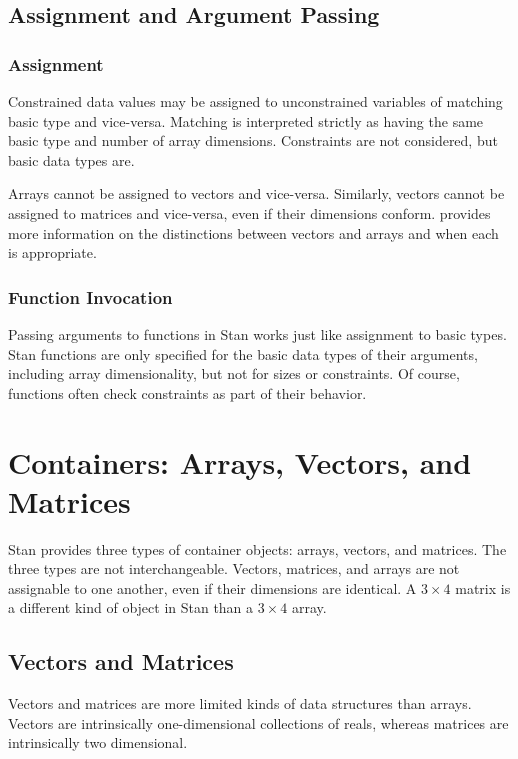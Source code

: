 \section{Assignment and Argument Passing}

\subsection{Assignment}

Constrained data values may be assigned to unconstrained variables of
matching basic type and vice-versa.   Matching is interpreted strictly
as having the same basic type and number of array dimensions.
Constraints are not considered, but basic data types are.  

Arrays cannot be assigned to vectors and vice-versa.  Similarly,
vectors cannot be assigned to matrices and vice-versa, even if their
dimensions conform.   provides more information
on the distinctions between vectors and arrays and when each is
appropriate.

\subsection{Function Invocation}

Passing arguments to functions in Stan works just like assignment to
basic types.  Stan functions are only specified for the basic data
types of their arguments, including array dimensionality, but not for
sizes or constraints.  Of course, functions often check constraints as
part of their behavior.  



\chapter{Containers: Arrays, Vectors, and Matrices}\label{containers.chapter}

\noindent
Stan provides three types of container objects: arrays, vectors, and
matrices.  The three types are not interchangeable.  Vectors, matrices,
and arrays are not assignable to one another, even if their dimensions
are identical.  A $3 \times 4$ matrix is a different kind of object in
Stan than a $3 \times 4$ array. 

\section{Vectors and Matrices}

Vectors and matrices are more limited kinds of data structures than
arrays.  Vectors are intrinsically one-dimensional collections of
reals, whereas matrices are intrinsically two dimensional. 

